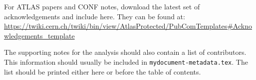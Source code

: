 \documentclass[UKenglish,texmf]{atlasdoc}
\begin{document}
For ATLAS papers and CONF notes, download the latest set of acknowledgements and include here.
They can be found at:\\
\url{https://twiki.cern.ch/twiki/bin/view/AtlasProtected/PubComTemplates#Acknowledgements_template}

The supporting notes for the analysis should also contain a list of contributors.
This information should usually be included in \texttt{mydocument-metadata.tex}.
The list should be printed either here or before the table of contents.




\printbibliography
%
%
\end{document}
